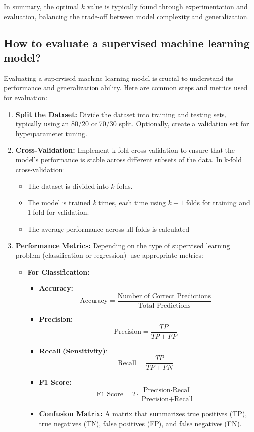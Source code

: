 In summary, the optimal \( k \) value is typically found through experimentation and evaluation, balancing the trade-off between model complexity and generalization.


\subsection{How to evaluate a supervised machine learning model?}

Evaluating a supervised machine learning model is crucial to understand its performance and generalization ability. Here are common steps and metrics used for evaluation:

\begin{enumerate}
    \item \textbf{Split the Dataset:}
    Divide the dataset into training and testing sets, typically using an 80/20 or 70/30 split. Optionally, create a validation set for hyperparameter tuning.

    \item \textbf{Cross-Validation:}
    Implement k-fold cross-validation to ensure that the model's performance is stable across different subsets of the data. In k-fold cross-validation:
    \begin{itemize}
        \item The dataset is divided into \( k \) folds.
        \item The model is trained \( k \) times, each time using \( k-1 \) folds for training and 1 fold for validation.
        \item The average performance across all folds is calculated.
    \end{itemize}

    \item \textbf{Performance Metrics:}
    Depending on the type of supervised learning problem (classification or regression), use appropriate metrics:

    \begin{itemize}
        \item \textbf{For Classification:}
        \begin{itemize}
            \item \textbf{Accuracy:} 
            \[
            \text{Accuracy} = \frac{\text{Number of Correct Predictions}}{\text{Total Predictions}}
            \]
            \item \textbf{Precision:} 
            \[
            \text{Precision} = \frac{TP}{TP + FP}
            \]
            \item \textbf{Recall (Sensitivity):} 
            \[
            \text{Recall} = \frac{TP}{TP + FN}
            \]
            \item \textbf{F1 Score:} 
            \[
            \text{F1 Score} = 2 \cdot \frac{\text{Precision} \cdot \text{Recall}}{\text{Precision} + \text{Recall}}
            \]
            \item \textbf{Confusion Matrix:} A matrix that summarizes true positives (TP), true negatives (TN), false positives (FP), and false negatives (FN).
        \end{itemize}


\end{itemize}
\end{enumerate}
